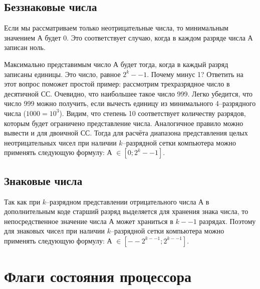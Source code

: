 \subsection{Беззнаковые числа}
Если мы рассматриваем только неотрицательные числа, то минимальным значением А будет 0. Это соответствует случаю, когда в каждом разряде числа А записан ноль.

Максимально представимым число А будет тогда, когда в каждый разряд записаны единицы. Это число, равное $2^k--1$.
Почему минус 1? Ответить на этот вопрос поможет простой пример: рассмотрим трехразрядное число в десятичной СС. Очевидно, что наибольшее такое число 999. Легко убедится, что число 999 можно получить, если вычесть единицу из минимального 4--разрядного числа ($1000 = 10^3$). Видим, что степень 10 соответствует количеству разрядов, которым будет ограничено представление числа. Аналогичное правило можно вывести и для двоичной СС. Тогда для расчёта диапазона представления целых неотрицательных чисел при наличии $k$--разрядной сетки компьютера можно применять следующую формулу: А $\in [0;2^k--1]$.

\subsection{Знаковые числа}
Так как при $k$--разрядном представлении отрицательного числа А в дополнительным коде старший разряд выделяется для хранения знака числа, то непосредственное значение числа А может храниться в $k--1$ разрядах. Поэтому для знаковых чисел при наличии $k$--разрядной сетки компьютера можно применять следующую формулу: А $\in [--2^{k--1};2^{k--1}]$.

\section{Флаги состояния процессора}

